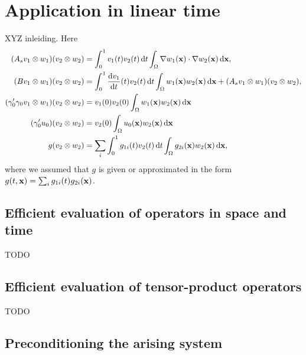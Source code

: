 \documentclass[11pt,a4paper,oneside,english]{amsart}
\numberwithin{equation}{section}
\numberwithin{theorem}{section}
\theoremstyle{definition}
\newcommand{\jw}[1]{{\color{red}{JW: #1}}}
\begin{document}
\section{Application in linear time}
XYZ inleiding. Here
\begin{align*}
(A_s v_1 \otimes w_1)(v_2 \otimes w_2)&=\int_0^1 v_1(t) v_2(t)\dif t \int_\Omega \nabla w_1({\bf x})\cdot  \nabla w_2({\bf x}) \dif{\bf x},\\
(B v_1 \otimes w_1)(v_2 \otimes w_2)&=\int_0^1 \frac{\dif v_1}{\dif t}(t) v_2(t)\dif t \int_\Omega w_1({\bf x}) w_2({\bf x}) \dif {\bf x}+(A_s v_1 \otimes w_1)(v_2 \otimes w_2),\\
(\gamma_0' \gamma_0 v_1 \otimes w_1)(v_2 \otimes w_2)&=
v_1(0) v_2(0)\int_\Omega w_1({\bf x}) w_2({\bf x}) \dif {\bf x}\\
(\gamma_0' u_0)(v_2 \otimes w_2)&=v_2(0) \int_\Omega u_0({\bf x}) w_2({\bf x}) \dif {\bf x}\\
g(v_2 \otimes w_2)&=\sum_i \int_0^1g_{1i}(t) v_2(t)\dif t \int_\Omega g_{2i}({\bf x}) w_2({\bf x}) \dif  {\bf x},
\end{align*}
where we assumed that $g$ is given or approximated in the form $g(t,{\bf x})=\sum_i g_{1i}(t) g_{2i}({\bf x})$.
\subsection{Efficient evaluation of operators in space and time}
TODO
\subsection{Efficient evaluation of tensor-product operators}
TODO
\subsection{Preconditioning the arising system}
\jw{introduce operator preconditioning}
\end{document}
